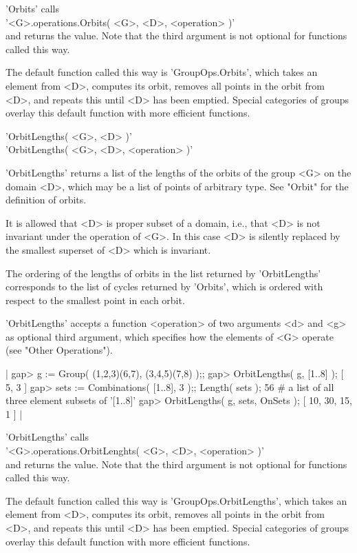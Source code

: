 'Orbits' calls \\
'<G>.operations.Orbits( <G>, <D>, <operation> )' \\
and returns the value.  Note that the third argument is  not optional for
functions called this way.

The default function called this way is 'GroupOps.Orbits', which takes an
element from  <D>, computes its  orbit, removes all  points in the  orbit
from  <D>,  and  repeats  this  until  <D>  has  been  emptied.   Special
categories of  groups  overlay this default  function with more efficient
functions.


'OrbitLengths( <G>, <D> )' \\
'OrbitLengths( <G>, <D>, <operation> )'

'OrbitLengths' returns a list of the lengths  of  the orbits of the group
<G> on the domain <D>, which may be a list of  points of arbitrary  type.
See "Orbit" for the definition of orbits.

It is allowed that <D>  is  proper subset of a domain,  i.e., that <D> is
not invariant under the operation of <G>.   In this case  <D> is silently
replaced by the smallest superset of <D> which is invariant.

The  ordering   of  the  lengths  of  orbits  in  the  list  returned  by
'OrbitLengths'  corresponds to the list of cycles returned  by  'Orbits',
which is ordered with respect to the smallest point in each orbit.

'OrbitLengths' accepts  a  function <operation> of two arguments  <d> and
<g> as optional third argument, which specifies how  the elements  of <G>
operate (see "Other Operations").

|    gap> g := Group( (1,2,3)(6,7), (3,4,5)(7,8) );;
    gap> OrbitLengths( g, [1..8] );
    [ 5, 3 ]
    gap> sets := Combinations( [1..8], 3 );; Length( sets );
    56    # a list of all three element subsets of '[1..8]'
    gap> OrbitLengths( g, sets, OnSets );
    [ 10, 30, 15, 1 ] |

'OrbitLengths' calls \\
'<G>.operations.OrbitLenghts( <G>, <D>, <operation> )' \\
and returns the value.  Note that the  third argument is not optional for
functions called this way.

The default  function called this way is  'GroupOps.OrbitLengths',  which
takes an element from <D>, computes its orbit, removes all points  in the
orbit from <D>,  and repeats this until <D>  has been  emptied.   Special
categories  of groups  overlay  this default function with more efficient
functions.

